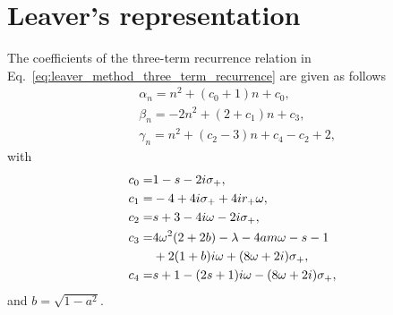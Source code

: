 \documentclass[aps,prd,amsmath,floats,floatfix, twocolumn,
superscriptaddress,nofootinbib,showpacs]{revtex4-1}
\begin{document}
\appendix

\section{Leaver's representation}
\label{app:Leaver}
The coefficients of the three-term recurrence relation in Eq.~\eqref{eq:leaver_method_three_term_recurrence} are given as follows \cite{leaver1985analytic}
\begin{equation}
\label{eq:leaver_alpha_beta_gamma}
\begin{aligned}
    &\alpha_n=n^2+(c_0+1)n+c_0,\\
    &\beta_n=-2n^2+(2+c_1)n+c_3, \\
    &\gamma_n=n^2+(c_2-3)n+c_4-c_2+2,
\end{aligned}
\end{equation}
with
\begin{align}
    c_0=&1-s-2i\sigma_+, \notag  \\
    c_1=&-4+4i\sigma_++4ir_+\omega, \notag  \\
    c_2=&s+3-4i\omega-2i\sigma_+, \notag  \\
    c_3=&4\omega^2(2+2b)-\lambda-4am\omega-s-1\notag \\
    &+2(1+b)i\omega+(8\omega+2i)\sigma_+, \notag \\
    c_4=&s+1-(2s+1)i\omega-(8\omega+2i)\sigma_+,\notag 
\end{align}
and $b=\sqrt{1-a^2}$.
\end{document}
